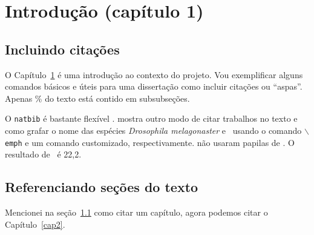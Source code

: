\cleardoublepage

\pagestyle{fancy}


\chapter{Introdução (capítulo 1)}\label{intro}

\section{Incluindo citações}\label{intro:historico}

O Capítulo~\ref{intro} é uma introdução ao contexto do projeto.
Vou exemplificar alguns comandos básicos e úteis para uma dissertação como incluir citações \citep{Sand-Jensen2007} ou ``aspas''.
Apenas \unit[4]{\%} do texto está contido em subsubseções.

O \texttt{natbib} é bastante flexível \citep[ver detalhes em][]{Kirk2008}.
\citet{Emlet1987} mostra outro modo de citar trabalhos no texto e como grafar o nome das espécies \emph{Drosophila melagonaster} e \subde\ usando o comando \texttt{$\backslash$emph} e um comando customizado, respectivamente.
\citet{Day2006} não usaram papilas de \subsus.
O resultado de \subsus\ é 22,2.

\section{Referenciando seções do texto}\label{intro:contexto}

Mencionei na seção~\ref{intro:historico} como citar um capítulo, agora podemos citar o Capítulo~\ref{cap2}.
